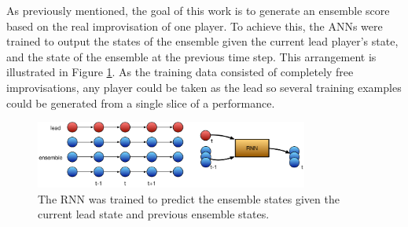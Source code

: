 \documentclass{article}
\begin{document}
As previously mentioned, the goal of this work is to generate an
ensemble score based on the real improvisation of one player. To
achieve this, the ANNs were trained to output the states of the
ensemble given the current lead player's state, and the state of the
ensemble at the previous time step. This arrangement is illustrated in
Figure \ref{fig:nn-ensemble-training}. As the training data consisted
of completely free improvisations, any player could be taken as the
lead so several training examples could be generated from a single
slice of a performance.

\begin{figure}
  \centering
  \includegraphics[width=0.8\textwidth]{nn-ensemble-training}
  \caption{The RNN was trained to predict the ensemble states given
    the current lead state and previous ensemble
    states.}\label{fig:nn-ensemble-training}
\end{figure}


 

\end{document}
